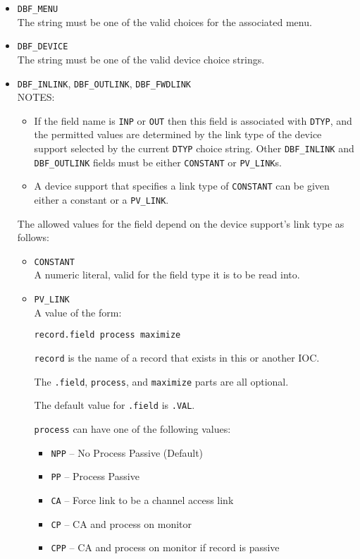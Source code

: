 \begin{description}
\begin{itemize}
\item \verb|DBF_MENU| \\
The string must be one of the valid choices for the associated menu.

\item \verb|DBF_DEVICE| \\
The string must be one of the valid device choice strings.

\item \verb|DBF_INLINK|, \verb|DBF_OUTLINK|, \verb|DBF_FWDLINK| \\
NOTES:

\begin{itemize}
\item If the field name is \verb|INP| or \verb|OUT| then this field is associated with \verb|DTYP|, and the permitted values
are determined by the link type of the device support selected by the current \verb|DTYP| choice string.
Other \verb|DBF_INLINK| and \verb|DBF_OUTLINK| fields must be either \verb|CONSTANT| or \verb|PV_LINK|s.

\item A device support that specifies a link type of \verb|CONSTANT| can be given either a constant or a \verb|PV_LINK|.
\end{itemize}

The allowed values for the field depend on the device support's link type as follows:

\begin{itemize}
\item \verb|CONSTANT| \\
A numeric literal, valid for the field type it is to be read into.

\item \verb|PV_LINK| \\
A value of the form:

\begin{verbatim}
record.field process maximize
\end{verbatim}

\verb|record| is the name of a record that exists in this or another IOC.

The \verb|.field|, \verb|process|, and \verb|maximize| parts are all optional.

The default value for \verb|.field| is \verb|.VAL|.

\verb|process| can have one of the following values:

\begin{itemize}
\item \verb|NPP| -- No Process Passive (Default)
\item \verb|PP| -- Process Passive
\item \verb|CA| -- Force link to be a channel access link
\item \verb|CP| -- CA and process on monitor
\item \verb|CPP| -- CA and process on monitor if record is passive


\end{itemize}
\end{itemize}
\end{itemize}
\end{description}
